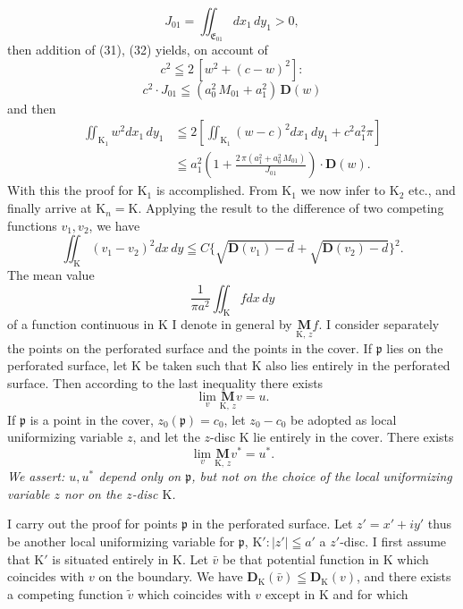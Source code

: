 \documentclass{article}
\begin{document}
\[ J_{01} = \iint_{\mathfrak{E}_{01}} dx_1\,dy_1 > 0, \]
then addition of (31), (32) yields, on account of
\[ c^2 \leqq 2\,[w^2 + (c - w)^2]\colon \]
\[ c^2 \cdot J_{01} \leqq (a_0^2\,M_{01} + a_1^2)\,\mathbf{D}(w) \]
and then
\[ \begin{aligned}
\iint_{\mathrm{K}_1} w^2 dx_1\,dy_1 &\leqq 2 \left[ \iint_{\mathrm{K}_1} (w - c)^2 dx_1\,dy_1 + c^2 a_1^2\pi \right] \\
&\leqq a_1^2 \left( 1 + \frac{2\,\pi(a_1^2 + a_0^2\,M_{01})}{J_{01}} \right) \cdot \mathbf{D}(w).
\end{aligned} \]
With this the proof for $\mathrm{K}_1$ is accomplished. From $\mathrm{K}_1$ we now infer to $\mathrm{K}_2$ etc., and finally arrive at $\mathrm{K}_n = \mathrm{K}$. Applying the result to the difference of two competing functions $v_1, v_2$, we have
\[ \iint_{\mathrm{K}} (v_1 - v_2)^2 dx\,dy \leqq C \bigl\{ \sqrt{\mathbf{D}(v_1) - d} + \sqrt{\mathbf{D}(v_2) - d} \bigr\}^2. \tag{33} \]
The mean value
\[ \frac{1}{\pi a^2} \iint_{\mathrm{K}} f dx\,dy \]
of a function continuous in $\mathrm{K}$ I denote in general by $\underset{\mathrm{K},\,z}{\mathbf{M}} f$. I consider separately the points on the perforated surface and the points in the cover. If $\mathfrak{p}$ lies on the perforated surface, let $\mathrm{K}$ be taken such that $\mathrm{K}$ also lies entirely in the perforated surface. Then according to the last inequality there exists
\[ \lim_v \underset{\mathrm{K},\,z}{\mathbf{M}} v = u. \]
If $\mathfrak{p}$ is a point in the cover, $z_0(\mathfrak{p}) = c_0$, let $z_0 - c_0$ be adopted as local uniformizing variable $z$, and let the $z$-disc $\mathrm{K}$ lie entirely in the cover. There exists
\[ \lim_v \underset{\mathrm{K},\,z}{\mathbf{M}} v^* = u^*. \]
\emph{We assert: $u, u^*$ depend only on $\mathfrak{p}$, but not on the choice of the local uniformizing variable $z$ nor on the $z$-disc $\mathrm{K}$.}

I carry out the proof for points $\mathfrak{p}$ in the perforated surface. Let $z' = x' + iy'$ thus be another local uniformizing variable for $\mathfrak{p}$, $\mathrm{K}' : |z'| \leqq a'$ a $z'$-disc. I first assume that $\mathrm{K}'$ is situated entirely in $\mathrm{K}$. Let $\bar{v}$ be that potential function in $\mathrm{K}$ which coincides with $v$ on the boundary. We have $\mathbf{D}_{\mathrm{K}}(\bar{v}) \leqq \mathbf{D}_{\mathrm{K}}(v)$, and there exists a competing function $\tilde{v}$ which coincides with $v$ except in $\mathrm{K}$ and for which
\end{document}

